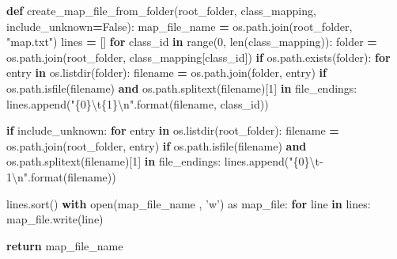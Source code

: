 \documentclass[]{book}
\newenvironment{Shaded}{\begin{snugshade}}{\end{snugshade}}
\newcommand{\KeywordTok}[1]{\textcolor[rgb]{0.13,0.29,0.53}{\textbf{#1}}}
\newcommand{\DecValTok}[1]{\textcolor[rgb]{0.00,0.00,0.81}{#1}}
\newcommand{\CharTok}[1]{\textcolor[rgb]{0.31,0.60,0.02}{#1}}
\newcommand{\SpecialCharTok}[1]{\textcolor[rgb]{0.00,0.00,0.00}{#1}}
\newcommand{\StringTok}[1]{\textcolor[rgb]{0.31,0.60,0.02}{#1}}
\newcommand{\ImportTok}[1]{#1}
\newcommand{\VariableTok}[1]{\textcolor[rgb]{0.00,0.00,0.00}{#1}}
\newcommand{\ControlFlowTok}[1]{\textcolor[rgb]{0.13,0.29,0.53}{\textbf{#1}}}
\newcommand{\OperatorTok}[1]{\textcolor[rgb]{0.81,0.36,0.00}{\textbf{#1}}}
\newcommand{\BuiltInTok}[1]{#1}
\newcommand{\NormalTok}[1]{#1}
\theoremstyle{definition}
\theoremstyle{definition}
\theoremstyle{definition}
\theoremstyle{remark}
\begin{document}
\begin{Shaded}
\begin{Highlighting}[]
\KeywordTok{def}\NormalTok{ create_map_file_from_folder(root_folder, class_mapping, include_unknown}\OperatorTok{=}\VariableTok{False}\NormalTok{):}
\NormalTok{    map_file_name }\OperatorTok{=}\NormalTok{ os.path.join(root_folder, }\StringTok{"map.txt"}\NormalTok{)}
\NormalTok{    lines }\OperatorTok{=}\NormalTok{ []}
    \ControlFlowTok{for}\NormalTok{ class_id }\KeywordTok{in} \BuiltInTok{range}\NormalTok{(}\DecValTok{0}\NormalTok{, }\BuiltInTok{len}\NormalTok{(class_mapping)):}
\NormalTok{        folder }\OperatorTok{=}\NormalTok{ os.path.join(root_folder, class_mapping[class_id])}
        \ControlFlowTok{if}\NormalTok{ os.path.exists(folder):}
            \ControlFlowTok{for}\NormalTok{ entry }\KeywordTok{in}\NormalTok{ os.listdir(folder):}
\NormalTok{                filename }\OperatorTok{=}\NormalTok{ os.path.join(folder, entry)}
                \ControlFlowTok{if}\NormalTok{ os.path.isfile(filename) }\KeywordTok{and}\NormalTok{ os.path.splitext(filename)[}\DecValTok{1}\NormalTok{] }\KeywordTok{in}\NormalTok{ file_endings:}
\NormalTok{                    lines.append(}\StringTok{"}\SpecialCharTok{\{0\}}\CharTok{\textbackslash{}t}\SpecialCharTok{\{1\}}\CharTok{\textbackslash{}n}\StringTok{"}\NormalTok{.}\BuiltInTok{format}\NormalTok{(filename, class_id))}

    \ControlFlowTok{if}\NormalTok{ include_unknown:}
        \ControlFlowTok{for}\NormalTok{ entry }\KeywordTok{in}\NormalTok{ os.listdir(root_folder):}
\NormalTok{            filename }\OperatorTok{=}\NormalTok{ os.path.join(root_folder, entry)}
            \ControlFlowTok{if}\NormalTok{ os.path.isfile(filename) }\KeywordTok{and}\NormalTok{ os.path.splitext(filename)[}\DecValTok{1}\NormalTok{] }\KeywordTok{in}\NormalTok{ file_endings:}
\NormalTok{                lines.append(}\StringTok{"}\SpecialCharTok{\{0\}}\CharTok{\textbackslash{}t}\StringTok{-1}\CharTok{\textbackslash{}n}\StringTok{"}\NormalTok{.}\BuiltInTok{format}\NormalTok{(filename))}

\NormalTok{    lines.sort()}
    \ControlFlowTok{with} \BuiltInTok{open}\NormalTok{(map_file_name , }\StringTok{'w'}\NormalTok{) }\ImportTok{as}\NormalTok{ map_file:}
        \ControlFlowTok{for}\NormalTok{ line }\KeywordTok{in}\NormalTok{ lines:}
\NormalTok{            map_file.write(line)}

    \ControlFlowTok{return}\NormalTok{ map_file_name}
\end{Highlighting}
\end{Shaded}
\end{document}
